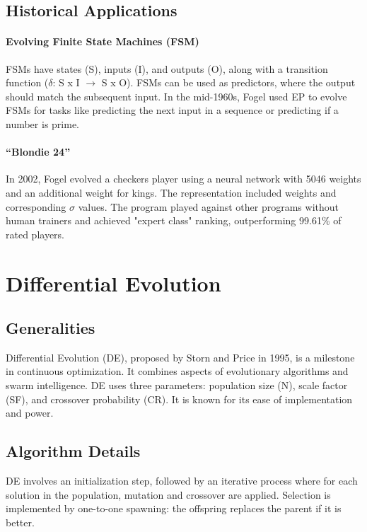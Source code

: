 \subsection*{Historical Applications}
\paragraph*{Evolving Finite State Machines (FSM)} FSMs have states (S), inputs (I), and outputs (O), along with a transition function ($\delta$: S x I $\rightarrow$ S x O). FSMs can be used as predictors, where the output should match the subsequent input. In the mid-1960s, Fogel used EP to evolve FSMs for tasks like predicting the next input in a sequence or predicting if a number is prime.

\paragraph*{“Blondie 24”} In 2002, Fogel evolved a checkers player using a neural network with 5046 weights and an additional weight for kings. The representation included weights and corresponding $\sigma$ values. The program played against other programs without human trainers and achieved "expert class" ranking, outperforming 99.61\% of rated players.

\section{Differential Evolution}
\subsection*{Generalities}
Differential Evolution (DE), proposed by Storn and Price in 1995, is a milestone in continuous optimization. It combines aspects of evolutionary algorithms and swarm intelligence. DE uses three parameters: population size (N), scale factor (SF), and crossover probability (CR). It is known for its ease of implementation and power.

\subsection*{Algorithm Details}
DE involves an initialization step, followed by an iterative process where for each solution in the population, mutation and crossover are applied. Selection is implemented by one-to-one spawning: the offspring replaces the parent if it is better.

